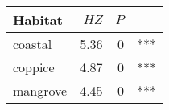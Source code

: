 
\begin{tabular}{lrrl}
\toprule
Habitat & $HZ$ & $P$ & \\
\midrule
coastal & 5.36 & 0 & ***\\
coppice & 4.87 & 0 & ***\\
mangrove & 4.45 & 0 & ***\\
\bottomrule
\end{tabular}
